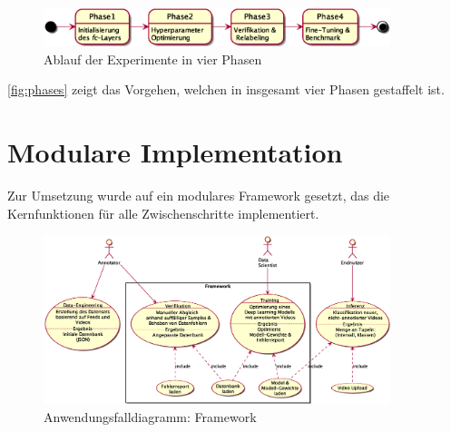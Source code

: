 \begin{figure}[htbp!]
    \centering
    \includegraphics[width=0.9\textwidth, height=0.8\textwidth, keepaspectratio, interpolate]{fig/phases.eps}
    \caption{Ablauf der Experimente in vier Phasen}
    \label{fig:phases}
\end{figure}

\autoref{fig:phases} zeigt das Vorgehen, welchen in insgesamt vier Phasen gestaffelt ist.

\section{Modulare Implementation}
\label{sec:konzeptuelle-umsetzung}

Zur Umsetzung wurde auf ein modulares Framework gesetzt, das die Kernfunktionen für alle Zwischenschritte implementiert.

\begin{figure}[htbp!]
    \centering
    \includegraphics[width=0.9\textwidth, height=0.8\textwidth, keepaspectratio, interpolate]{fig/usecase.eps}
    \caption{Anwendungsfalldiagramm: Framework}
    \label{fig:usecase}
\end{figure}

